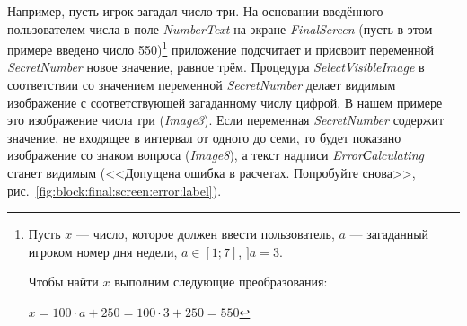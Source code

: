 Например, пусть игрок загадал число три. На основании введённого пользователем числа в поле \textit{NumberText} на экране \textit{FinalScreen}
(пусть в этом примере введено число 550)\footnote[][0.5cm]{ Пусть $ x $ — число, которое должен ввести пользователь, $ a $ — загаданный игроком номер дня недели, $ a \in [1;7] $, $ ] a = 3 $. 

Чтобы найти $ x $ выполним следующие преобразования:

$ x = 100 \cdot a + 250  = 100 \cdot 3 + 250  = 550 $}\marginnote[0.2cm]{} приложение подсчитает и присвоит переменной \textit{SecretNumber} новое значение, равное трём.
Процедура \textit{SelectVisibleImage} в соответствии со значением переменной \textit{SecretNumber} делает видимым изображение с соответствующей загаданному числу цифрой. 
В нашем примере это изображение числа три (\textit{Image3}). Если переменная \textit{SecretNumber} содержит значение, не входящее в интервал от одного до семи, то будет показано изображение со знаком вопроса (\textit{Image8}), а текст надписи \textit{ErrorСalculating} станет видимым (<<Допущена ошибка в расчетах. Попробуйте снова>>, рис.~\ref{fig:block:final:screen:error:label}).

